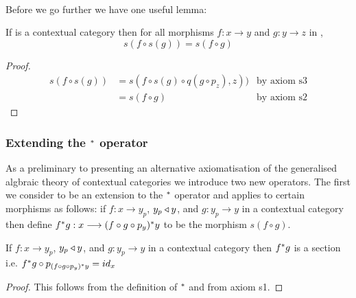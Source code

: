 \documentclass[10pt,a4paper]{scrartcl}
\begin{document}
\vspace{.03cm} \\
\noindent
Before we go further we have one useful lemma:
\begin{lemma} [lemma s4]
\label{s4}  
If  is a contextual category then for all morphisms $f: x \rightarrow y$ and $g:y \rightarrow z$ in ,
$$s(f \circ s(g)) = s(f \circ g)$$
\end{lemma}
\begin{proof}
\begin{align*}
s( f \circ s(g)) 
    & = s( f \circ s(g)\circ q(g \circ p_z) , z ))  &\mbox{by axiom s3}\\
    & = s(f \circ g) &\mbox{by axiom s2} 
\end{align*}
\end{proof}


\subsubsection {Extending the $^*$ operator}

As a preliminary to presenting an alternative axiomatisation of the generalised algbraic theory of contextual categories
we introduce two new operators. The first we consider to be an extension to the $^*$ operator and applies to certain morphisms as follows: 
if $f:x \longrightarrow y_p$, $y_p \triangleleft y$, and $g:y_p \longrightarrow y$ in a contextual category  then
define $f ^* g: x \longrightarrow (f \circ g \circ p_y) ^* y$ to be the morphism $s(f \circ g)$. \\

\begin{lemma} 
\label{lemmastarsection} 
\noindent If $f:x \longrightarrow y_p$, $y_p \triangleleft y$, and $g:y_p \longrightarrow y$ in a contextual category  then
$f ^* g$ is a section i.e. $f ^* g \circ p_{(f \circ g \circ p_y) ^* y} = id_x$
\end{lemma}
\begin{proof}
This follows from the definition of $^*$ and from axiom s1.
\end{proof}
\end{document}
